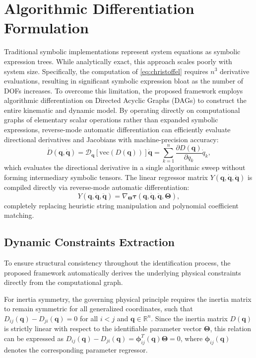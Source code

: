 \documentclass[lettersize,journal]{IEEEtran}
\begin{document}
\section{Algorithmic Differentiation Formulation}
\label{sec:casadi_engine}
Traditional symbolic implementations \cite{Asker2024} represent system equations as symbolic expression trees. While analytically exact, this approach scales poorly with system size. Specifically, the computation of \eqref{eq:christoffel} requires $n^{3}$ derivative evaluations, resulting in significant symbolic expression bloat as the number of DOFs increases. To overcome this limitation, the proposed framework employs algorithmic differentiation on Directed Acyclic Graphs (DAGs) \cite{Andersson2019} to construct the entire kinematic and dynamic model. By operating directly on computational graphs of elementary scalar operations rather than expanded symbolic expressions, reverse-mode automatic differentiation can efficiently evaluate directional derivatives and Jacobians with machine-precision accuracy:
\begin{equation}
    \dot{D}(\bm{q}, \dot{\bm{q}}) = \mathcal{D}_{\bm{q}}\left[\text{vec}(D(\bm{q}))\right]\dot{\bm{q}} = \sum_{k=1}^n \frac{\partial D(\bm{q})}{\partial q_k}\dot{q}_k,
\end{equation}
which evaluates the directional derivative in a single algorithmic sweep without forming intermediary symbolic tensors. The linear regressor matrix $Y(\bm{q}, \dot{\bm{q}}, \ddot{\bm{q}})$ is compiled directly via reverse-mode automatic differentiation:
\begin{equation}
    Y(\bm{q}, \dot{\bm{q}}, \ddot{\bm{q}}) = \nabla_{\bm{\Theta}} \bm{\tau}(\bm{q}, \dot{\bm{q}}, \ddot{\bm{q}}, \bm{\Theta}),
\end{equation}
completely replacing heuristic string manipulation and polynomial coefficient matching.

\subsection{Dynamic Constraints Extraction}
To ensure structural consistency throughout the identification process, the proposed framework automatically derives the underlying physical constraints directly from the computational graph.

For inertia symmetry, the governing physical principle requires the inertia matrix to remain symmetric for all generalized coordinates, such that $D_{ij}(\bm{q}) - D_{ji}(\bm{q}) = 0$ for all $i < j$ and $\bm{q} \in \mathbb{R}^n$. Since the inertia matrix $D(\bm{q})$ is strictly linear with respect to the identifiable parameter vector $\bm{\Theta}$, this relation can be expressed as $D_{ij}(\bm{q}) - D_{ji}(\bm{q}) = \bm{\phi}_{ij}^T(\bm{q})\bm{\Theta} = 0$, where $\bm{\phi}_{ij}(\bm{q})$ denotes the corresponding parameter regressor.
\end{document}
